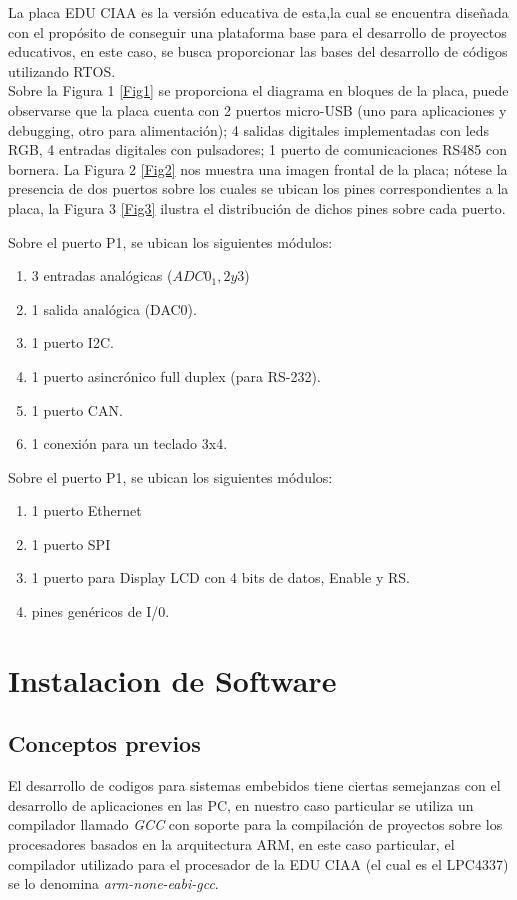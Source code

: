 \documentclass[12pt,letterpaper]{article}
\begin{document}
La placa EDU CIAA es la versión educativa de esta,la cual se encuentra diseñada con el propósito de conseguir una plataforma base para el desarrollo de proyectos educativos, en este caso, se busca proporcionar las bases del desarrollo de códigos utilizando RTOS.\\


Sobre la Figura 1 \ref{Fig1} se proporciona el diagrama en bloques de la placa, puede observarse que la placa cuenta con 2 puertos micro-USB (uno para aplicaciones y debugging, otro para alimentación); 4 salidas digitales implementadas con leds RGB, 4 entradas digitales con pulsadores; 1 puerto de comunicaciones RS485 con bornera. La Figura 2 \ref{Fig2} nos muestra  una imagen frontal de la placa; nótese la presencia de dos puertos sobre los cuales se ubican los pines correspondientes a la placa, la Figura 3 \ref{Fig3} ilustra el distribución de dichos pines sobre cada puerto.


Sobre el puerto P1, se ubican los siguientes módulos:

\begin{enumerate}
\item 3 entradas analógicas ($ADC0_ 1,2 y 3$)
\item 1 salida analógica (DAC0).
\item 1 puerto I2C.
\item 1 puerto asincrónico full duplex (para RS-232).
\item 1 puerto CAN.
\item 1 conexión para un teclado 3x4.
\end{enumerate}

Sobre el puerto P1, se ubican los siguientes módulos:

\begin{enumerate}
\item 1 puerto Ethernet
\item 1 puerto SPI
\item 1 puerto para Display LCD con 4 bits de datos, Enable y RS.
\item pines genéricos de I/0.
\end{enumerate}

\section{Instalacion de Software}

\subsection{Conceptos previos}
El desarrollo de codigos para sistemas embebidos tiene ciertas semejanzas con el desarrollo de aplicaciones en las PC, en nuestro caso particular se utiliza un compilador llamado \textit{GCC} con soporte para la compilación de proyectos sobre los procesadores basados en la arquitectura ARM, en este caso particular, el compilador utilizado para el procesador de la EDU CIAA (el cual es el LPC4337) se lo denomina \textit{arm-none-eabi-gcc}.\\
\end{document}
